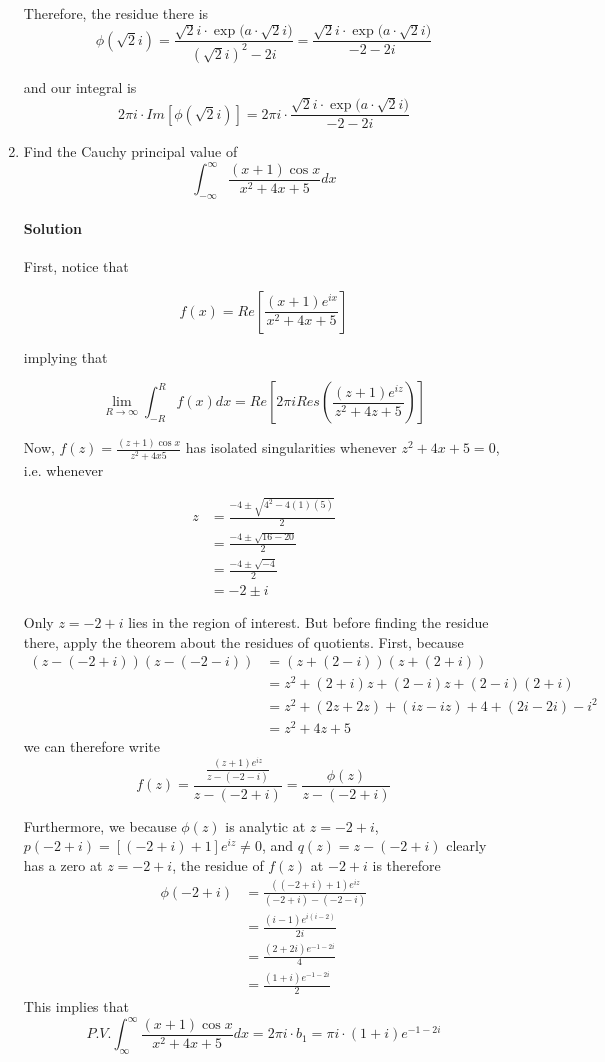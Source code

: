 \documentclass[11pt]{article}
\begin{document}
\begin{enumerate}
	Therefore, the residue there is 
		\[\phi(\sqrt{2}i) 
			= \frac{\sqrt{2}i \cdot \exp{(a \cdot \sqrt{2}i})}{
			(\sqrt{2}i)^2 - 2i}
			= \frac{\sqrt{2}i \cdot \exp{(a \cdot \sqrt{2}i})}{
			-2 - 2i}\]
	
	and our integral is
	\[2\pi i \cdot Im[\phi(\sqrt{2}i)]  = 2\pi i \cdot \frac{\sqrt{2}i \cdot \exp{(a \cdot \sqrt{2}i})}{
		-2 - 2i}\]
	
	\item Find the Cauchy principal value of
	\[ \int^{\infty}_{-\infty} \frac{(x + 1) \cos{x}}{x^2 + 4x + 5} dx \]
	
	\paragraph{Solution} First, notice that
	
	\[f(x) = Re[\frac{(x+1)e^{ix}}{x^2 + 4x + 5}]\]
	
	implying that
	
	\[\lim_{R \rightarrow \infty} \int^{R}_{-R} f(x) dx
	= Re[2\pi i Res(\frac{(z+1)e^{iz}}{z^2 + 4z + 5})] \]
	
	Now, $f(z) = \frac{(z+1) \cos{x}}{z^2 + 4x 5}$ has isolated singularities whenever
	$z^2 + 4x + 5 = 0$, i.e. whenever
	
	\[\begin{aligned}	
		z
		&= \frac{-4 \pm \sqrt{4^2 - 4(1)(5)}}{2} \\
		&= \frac{-4 \pm \sqrt{16 - 20}}{2} \\
		&= \frac{-4 \pm \sqrt{-4}}{2} \\
		&= -2 \pm i
	\end{aligned}\]
	
	Only $z = -2 + i$ lies in the region of interest. But before finding the residue there, apply the theorem about the residues of quotients. First, because
	\[\begin{aligned}
	(z - (-2 + i))(z - (-2 - i)) 
	&= (z + (2 - i))(z + (2 + i)) \\
	&= z^2 + (2 + i)z + (2 - i)z + (2-i)(2+i) \\
	&= z^2 + (2z + 2z) + (iz - iz) + 4 + (2i - 2i) - i^2 \\
	&= z^2 + 4z + 5
	\end{aligned}\]
	we can therefore write
	\[f(z) = \frac{\frac{ (z + 1)e^{iz}}{z - (-2 - i)} }{
		z - (-2 + i)}
	= \frac{\phi(z)}{z - (-2 + i)} \]
	
	Furthermore, we because $\phi(z)$ is analytic at $z = -2 + i$, $p(-2 + i) = [(-2 + i) + 1]e^{iz} \neq 0$, and $q(z) = z - (-2 + i)$ clearly has a zero at $z = -2 + i$, the residue of $f(z)$ at $-2 + i$ is therefore
	\[\begin{aligned}
		\phi(-2 + i)
		&= \frac{ ((-2 + i) + 1)e^{iz}}{(-2 + i) - (-2 - i)} \\
		&= \frac{(i - 1)e^{i(i - 2)}}{2i} \\
		&= \frac{(2 + 2i)e^{-1 - 2i}}{4} \\
		&= \frac{(1 + i)e^{-1 - 2i}}{2}
	\end{aligned}\]
	This implies that
	\[P.V. \int^{\infty}_{\infty} \frac{(x + 1) \cos{x}}{x^2 + 4x + 5} dx =
	2\pi i \cdot b_1 =
	\pi i \cdot (1 + i)e^{-1 - 2i} \]
\end{enumerate}
\end{document}
